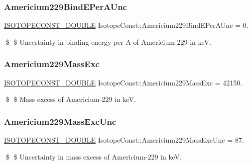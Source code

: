 \subsubsection{\texorpdfstring{Americium229\+Bind\+E\+Per\+A\+Unc}{Americium229BindEPerAUnc}}
{\footnotesize\ttfamily \mbox{\hyperlink{group___isotope_const-_macros_ga8f45a7272ce02c0b4c65c44636ed719a}{I\+S\+O\+T\+O\+P\+E\+C\+O\+N\+S\+T\+\_\+\+D\+O\+U\+B\+LE}} Isotope\+Const\+::\+Americium229\+Bind\+E\+Per\+A\+Unc = 0.}

\$ \$ Uncertainty in binding energy per A of Americium-\/229 in keV. \mbox{\label{group___isotope_const-_americium-_am229_ga90540e7cddd7ee3ebf4d5e31228d0e25}} 
\subsubsection{\texorpdfstring{Americium229\+Mass\+Exc}{Americium229MassExc}}
{\footnotesize\ttfamily \mbox{\hyperlink{group___isotope_const-_macros_ga8f45a7272ce02c0b4c65c44636ed719a}{I\+S\+O\+T\+O\+P\+E\+C\+O\+N\+S\+T\+\_\+\+D\+O\+U\+B\+LE}} Isotope\+Const\+::\+Americium229\+Mass\+Exc = 42150.}

\$ \$ Mass excess of Americium-\/229 in keV. \mbox{\label{group___isotope_const-_americium-_am229_ga6e218ef063fffef282d8e3e5ab6814bd}} 
\subsubsection{\texorpdfstring{Americium229\+Mass\+Exc\+Unc}{Americium229MassExcUnc}}
{\footnotesize\ttfamily \mbox{\hyperlink{group___isotope_const-_macros_ga8f45a7272ce02c0b4c65c44636ed719a}{I\+S\+O\+T\+O\+P\+E\+C\+O\+N\+S\+T\+\_\+\+D\+O\+U\+B\+LE}} Isotope\+Const\+::\+Americium229\+Mass\+Exc\+Unc = 87.}

\$ \$ Uncertainty in mass excess of Americium-\/229 in keV. \mbox{\label{group___isotope_const-_americium-_am229_ga810d356e053f17620ce1c55ebf44049b}} 
